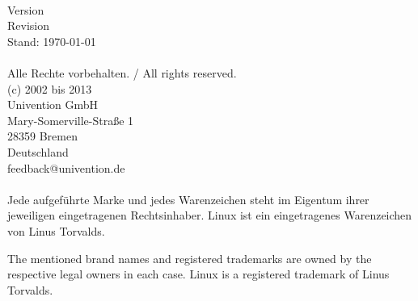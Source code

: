 
\begin{titlepage}
  \thispagestyle{empty}


  \vspace*{3cm}
  \sffamily \bfseries
  \begin{center}
    \Huge
      \ucsManualTitle \\ [3.5cm]
    \huge
      \ucsManualSubtitle
  \end{center}
  \normalsize
  \normalfont

\newpage
\AddToShipoutPicture{\ifthenelse{\isodd{\thepage}}%
	{\BackgroundPicOdd}{\BackgroundPicEven}}
\thispagestyle{empty}
\parindent0cm
\sffamily
\vspace*{11cm}

Version \ucsManualVersion \\
Revision \ucsSVNVersion \\
Stand: \today \\
\\
Alle Rechte vorbehalten. / All rights reserved.\\
(c) 2002 bis 2013 \\
Univention GmbH \\
Mary-Somerville-Straße 1 \\
28359 Bremen \\
Deutschland \\
feedback@univention.de \\
\\
Jede aufgeführte Marke und jedes Warenzeichen steht im Eigentum ihrer
jeweiligen eingetragenen Rechtsinhaber. Linux ist ein eingetragenes
Warenzeichen von Linus Torvalds.

The mentioned brand names and registered trademarks are owned by the
respective legal owners in each case. Linux is a registered trademark
of Linus Torvalds.

\end{titlepage}


\dominitoc
\tableofcontents
\newpage

